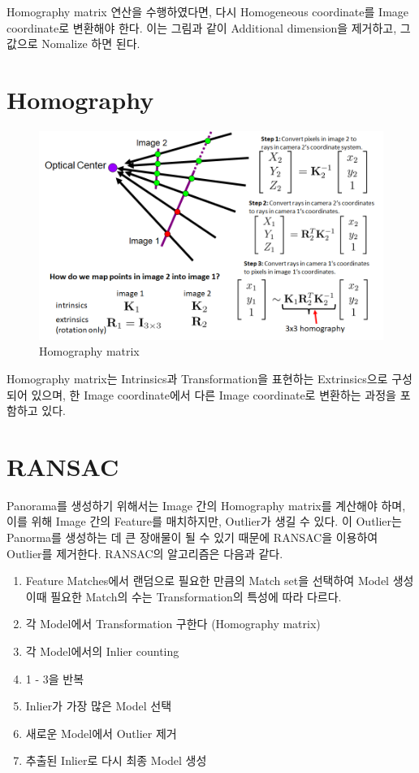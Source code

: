 \documentclass[]{report}
\begin{document}
Homography matrix 연산을 수행하였다면, 다시 Homogeneous coordinate를 Image coordinate로 변환해야 한다. 
이는 그림과 같이 Additional dimension을 제거하고, 그 값으로 Nomalize 하면 된다. \\

\section{Homography}

\begin{figure}[ht!]
	\centering
	\includegraphics[width=1\textwidth]{image/homography_matrix.png}
	\caption{Homography matrix}
	\label{homography_matrix}
\end{figure}

Homography matrix는 Intrinsics과 Transformation을 표현하는 Extrinsics으로 구성되어 있으며, 
한 Image coordinate에서 다른 Image coordinate로 변환하는 과정을 포함하고 있다. \\

\section{RANSAC}

Panorama를 생성하기 위해서는 Image 간의 Homography matrix를 계산해야 하며,
이를 위해 Image 간의 Feature를 매치하지만, Outlier가 생길 수 있다. 
이 Outlier는 Panorma를 생성하는 데 큰 장애물이 될 수 있기 때문에 RANSAC을 이용하여 Outlier를 제거한다. 
RANSAC의 알고리즘은 다음과 같다. \\

\begin{enumerate}
	\item Feature Matches에서 랜덤으로 필요한 만큼의 Match set을 선택하여 Model 생성 \\
        이때 필요한 Match의 수는 Transformation의 특성에 따라 다르다. 
	\item 각 Model에서 Transformation 구한다 (Homography matrix)
	\item 각 Model에서의 Inlier counting
	\item 1 - 3을 반복
	\item Inlier가 가장 많은 Model 선택
	\item 새로운 Model에서 Outlier 제거
	\item 추출된 Inlier로 다시 최종 Model 생성 \\
\end{enumerate}
\end{document}

